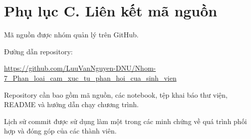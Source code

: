\section*{Phụ lục C. Liên kết mã nguồn}

Mã nguồn được nhóm quản lý trên GitHub.

Đường dẫn repository:

\begin{center}
\url{https://github.com/LuuVanNguyen-DNU/Nhom-7_Phan_loai_cam_xuc_tu_phan_hoi_cua_sinh_vien}
\end{center}

Repository cần bao gồm mã nguồn,
các notebook, tệp khai báo thư viện,
README và hướng dẫn chạy chương trình.

Lịch sử commit được sử dụng làm
một trong các minh chứng về quá trình
phối hợp và đóng góp của các thành viên.
